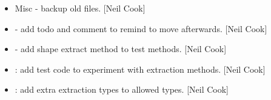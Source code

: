 \documentclass[a4paper,10pt,english]{report}
\begin{document}
\begin{itemize}
\item {} 
Misc - backup old files. {[}Neil Cook{]}

\item {} 
 - add todo and comment to remind to move afterwards.
{[}Neil Cook{]}

\item {} 
 - add shape extract method to test methods. {[}Neil Cook{]}

\item {} 
: add test code to experiment with extraction
methods. {[}Neil Cook{]}

\item {} 
: add extra extraction types to allowed types.
{[}Neil Cook{]}

\end{itemize}
\end{document}
